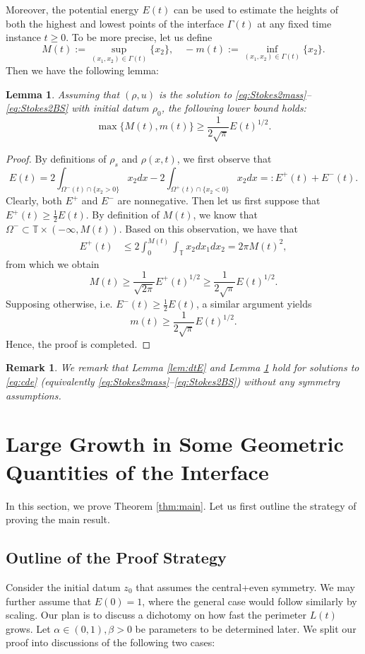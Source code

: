 \documentclass[11pt]{article}
\numberwithin{equation}{section}
\newtheorem{lem}[thm]{Lemma}
\newtheorem{rmk}[thm]{Remark}
\newcommand{\T}{\mathbb{T}}
\begin{document}
Moreover, the potential energy $E(t)$ can be used to estimate the heights of both the highest and lowest points of the interface $\Gamma(t)$ at any fixed time instance $t \ge 0$. To be more precise, let us define
$$
M(t) := \sup_{(x_1,x_2) \in \Gamma(t)}\{x_2\},\quad -m(t) := \inf_{(x_1,x_2) \in \Gamma(t)}\{x_2\}. 
$$
Then we have the following lemma:
\begin{lem}\label{lem:perimeterlb}
    Assuming that $(\rho,u)$ is the solution to \eqref{eq:Stokes2mass}--\eqref{eq:Stokes2BS} with initial datum $\rho_0$, the following lower bound holds:
    $$
    \max\{M(t), m(t)\} \ge \frac{1}{2\sqrt{\pi}}E(t)^{1/2}.
    $$
\end{lem}
\begin{proof}
    By definitions of $\rho_s$ and $\rho(x,t)$, we first observe that
    $$
    E(t) = 2\int_{\Omega^-(t) \cap \{x_2 > 0\}} x_2 dx - 2\int_{\Omega^{+}(t) \cap \{x_2 < 0\}} x_2 dx =: E^+(t) + E^{-}(t).
    $$
    Clearly, both $E^+$ and $E^-$ are nonnegative. Then let us first suppose that $E^+(t) \ge \frac12 E(t)$. By definition of $M(t)$, we know that $\Omega^- \subset \T \times (-\infty, M(t))$. Based on this observation, we have that
    \begin{align*}
        E^+(t) &\le 2\int_0^{M(t)}\int_\T x_2 dx_1 dx_2 = 2\pi M(t)^2,
    \end{align*}
    from which we obtain
    $$
    M(t) \ge \frac{1}{\sqrt{2\pi}}E^+(t)^{1/2} \ge \frac{1}{2\sqrt{\pi}}E(t)^{1/2}.
    $$
    Supposing otherwise, i.e. $E^-(t) \ge \frac12 E(t)$, a similar argument yields
    $$
    m(t) \ge \frac{1}{2\sqrt{\pi}}E(t)^{1/2}.
    $$
    Hence, the proof is completed.
\end{proof}
\begin{rmk}
    We remark that Lemma \ref{lem:dtE} and Lemma \ref{lem:perimeterlb} hold for solutions to \eqref{eq:cde} (equivalently \eqref{eq:Stokes2mass}--\eqref{eq:Stokes2BS}) without any symmetry assumptions.
\end{rmk}
 
\section{Large Growth in Some Geometric Quantities of the Interface}\label{sec:finiteE}
In this section, we prove Theorem \ref{thm:main}. Let us first outline the strategy of proving the main result.

\subsection{Outline of the Proof Strategy}
\label{sec:organization}
Consider the initial datum $z_0$ that assumes the central+even symmetry. We may further assume that $E(0) = 1$, where the general case would follow similarly by scaling. Our plan is to discuss a dichotomy on how fast the perimeter $L(t)$ grows. Let $\alpha \in (0,1), \beta > 0$ be parameters to be determined later. We split our proof into discussions of the following two cases:
\end{document}
